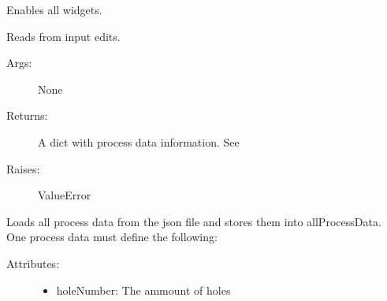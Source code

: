 \documentclass[letterpaper,10pt,english]{sphinxmanual}
\begin{document}
\begin{fulllineitems}
\begin{fulllineitems}
\end{fulllineitems}


\begin{fulllineitems}
\label{gui:gui.Gui.enableWidgets}
Enables all widgets.

\end{fulllineitems}


\begin{fulllineitems}
\label{gui:gui.Gui.getDataFromEdits}
Reads from input edits.
\begin{description}
\item[{Args:}] \leavevmode
None

\item[{Returns:}] \leavevmode
A dict with process data information. See {\hyperref[gui:gui.Gui.loadAllProcessData]{}}

\item[{Raises:}] \leavevmode
ValueError

\end{description}

\end{fulllineitems}


\begin{fulllineitems}
\label{gui:gui.Gui.getProcessDataByName}
\end{fulllineitems}


\begin{fulllineitems}
\label{gui:gui.Gui.loadAllProcessData}
Loads all process data from the json file and stores them into allProcessData.
One process data must define the following:
\begin{description}
\item[{Attributes:}] \leavevmode\begin{itemize}
\item {} 
holeNumber: The ammount of holes


\end{itemize}
\end{description}
\end{fulllineitems}
\end{fulllineitems}
\end{document}
